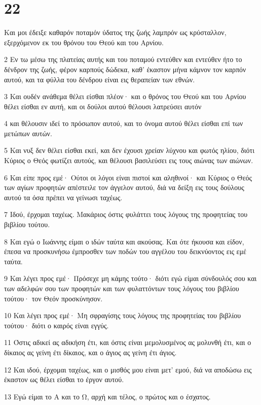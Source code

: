 \chapter{22}

\par Και μοι έδειξε καθαρόν ποταμόν ύδατος της ζωής λαμπρόν ως κρύσταλλον, εξερχόμενον εκ του θρόνου του Θεού και του Αρνίου.
\par 2 Εν τω μέσω της πλατείας αυτής και του ποταμού εντεύθεν και εντεύθεν ήτο το δένδρον της ζωής, φέρον καρπούς δώδεκα, καθ' έκαστον μήνα κάμνον τον καρπόν αυτού, και τα φύλλα του δένδρου είναι εις θεραπείαν των εθνών.
\par 3 Και ουδέν ανάθεμα θέλει είσθαι πλέον· και ο θρόνος του Θεού και του Αρνίου θέλει είσθαι εν αυτή, και οι δούλοι αυτού θέλουσι λατρεύσει αυτόν
\par 4 και θέλουσιν ιδεί το πρόσωπον αυτού, και το όνομα αυτού θέλει είσθαι επί των μετώπων αυτών.
\par 5 Και νυξ δεν θέλει είσθαι εκεί, και δεν έχουσι χρείαν λύχνου και φωτός ηλίου, διότι Κύριος ο Θεός φωτίζει αυτούς, και θέλουσι βασιλεύσει εις τους αιώνας των αιώνων.
\par 6 Και είπε προς εμέ· Ούτοι οι λόγοι είναι πιστοί και αληθινοί· και Κύριος ο Θεός των αγίων προφητών απέστειλε τον άγγελον αυτού, διά να δείξη εις τους δούλους αυτού τα όσα πρέπει να γείνωσι ταχέως.
\par 7 Ιδού, έρχομαι ταχέως. Μακάριος όστις φυλάττει τους λόγους της προφητείας του βιβλίου τούτου.
\par 8 Και εγώ ο Ιωάννης είμαι ο ιδών ταύτα και ακούσας. Και ότε ήκουσα και είδον, έπεσα να προσκυνήσω έμπροσθεν των ποδών του αγγέλου του δεικνύοντος εις εμέ ταύτα.
\par 9 Και λέγει προς εμέ· Πρόσεχε μη κάμης τούτο· διότι εγώ είμαι σύνδουλός σου και των αδελφών σου των προφητών και των φυλαττόντων τους λόγους του βιβλίου τούτου· τον Θεόν προσκύνησον.
\par 10 Και λέγει προς εμέ· Μη σφραγίσης τους λόγους της προφητείας του βιβλίου τούτου· διότι ο καιρός είναι εγγύς.
\par 11 Όστις αδικεί ας αδικήση έτι, και όστις είναι μεμολυσμένος ας μολυνθή έτι, και ο δίκαιος ας γείνη έτι δίκαιος, και ο άγιος ας γείνη έτι άγιος.
\par 12 Και ιδού, έρχομαι ταχέως, και ο μισθός μου είναι μετ' εμού, διά να αποδώσω εις έκαστον ως θέλει είσθαι το έργον αυτού.
\par 13 Εγώ είμαι το Α και το Ω, αρχή και τέλος, ο πρώτος και ο έσχατος.
